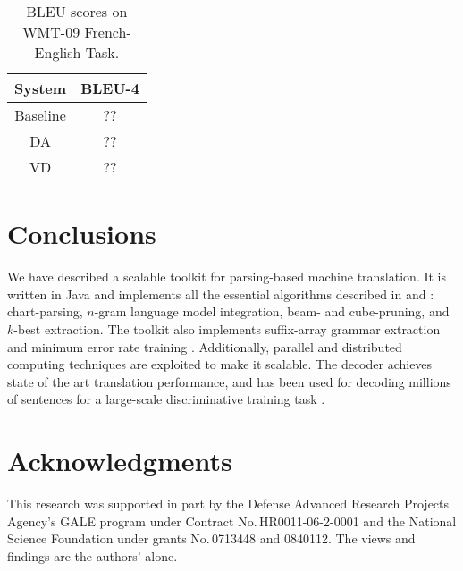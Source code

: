 \documentclass[11pt]{article}
\begin{document}
\begin{table}[t]
\begin{center}
\begin{tabular}{c c}\hline
System & BLEU-4 \\ \hline
Baseline & ?? \\
DA & ?? \\
VD & ?? \\ \hline
\end{tabular}
\end{center}
\caption{BLEU scores on WMT-09 French-English Task.}
\label{results-wmt09}
\end{table}

\section{Conclusions}
We have described a scalable toolkit for parsing-based machine translation. It is written in Java and implements all the essential algorithms described in  and : chart-parsing, $n$-gram language model integration, beam- and cube-pruning, and $k$-best extraction.
The toolkit also implements suffix-array grammar extraction \cite{adam-suffix} and minimum error rate training \cite{discriminative-mert}. Additionally, parallel and distributed computing techniques are exploited to make it scalable. The decoder achieves state of the art translation performance, and has been used for decoding millions of sentences for a large-scale discriminative training task \cite{zhifei-amta08}.





\section*{Acknowledgments}
This research was supported in part by the Defense Advanced Research Projects Agency's GALE program under Contract No.\,HR0011-06-2-0001 and the National Science Foundation under grants No.\,0713448 and 0840112. The views and findings are the authors' alone.

\end{document}
